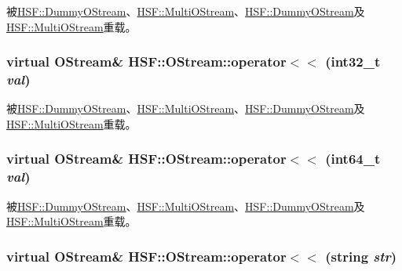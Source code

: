 被\hyperlink{classHSF_1_1DummyOStream_a7c3f9f5c2e3a05760819499df1aa6592}{HSF::DummyOStream}、\hyperlink{classHSF_1_1MultiOStream_a40a0605bc99045578fccf9c5413411f5}{HSF::MultiOStream}、\hyperlink{classHSF_1_1DummyOStream_a7c3f9f5c2e3a05760819499df1aa6592}{HSF::DummyOStream}及\hyperlink{classHSF_1_1MultiOStream_a40a0605bc99045578fccf9c5413411f5}{HSF::MultiOStream}重载。\hypertarget{classHSF_1_1OStream_a1bbf47f6f3c68938fb4c1006b878aa60}{
\subsubsection[{operator$<$$<$}]{\setlength{\rightskip}{0pt plus 5cm}virtual {\bf OStream}\& HSF::OStream::operator$<$$<$ (int32\_\-t {\em val})}}
\label{classHSF_1_1OStream_a1bbf47f6f3c68938fb4c1006b878aa60}


被\hyperlink{classHSF_1_1DummyOStream_a58e20bb47f254b73898d940bb496ee1f}{HSF::DummyOStream}、\hyperlink{classHSF_1_1MultiOStream_a83208fee91d9117cf7411cd63477c9fe}{HSF::MultiOStream}、\hyperlink{classHSF_1_1DummyOStream_a58e20bb47f254b73898d940bb496ee1f}{HSF::DummyOStream}及\hyperlink{classHSF_1_1MultiOStream_a83208fee91d9117cf7411cd63477c9fe}{HSF::MultiOStream}重载。\hypertarget{classHSF_1_1OStream_a771b87dab59786db30cf1d5eb5473e64}{
\subsubsection[{operator$<$$<$}]{\setlength{\rightskip}{0pt plus 5cm}virtual {\bf OStream}\& HSF::OStream::operator$<$$<$ (int64\_\-t {\em val})}}
\label{classHSF_1_1OStream_a771b87dab59786db30cf1d5eb5473e64}


被\hyperlink{classHSF_1_1DummyOStream_a439a7fa1b22a1e7bcc49fa43c686dc0d}{HSF::DummyOStream}、\hyperlink{classHSF_1_1MultiOStream_a960936ac105e7f2ed4801f0725dedfba}{HSF::MultiOStream}、\hyperlink{classHSF_1_1DummyOStream_a439a7fa1b22a1e7bcc49fa43c686dc0d}{HSF::DummyOStream}及\hyperlink{classHSF_1_1MultiOStream_a960936ac105e7f2ed4801f0725dedfba}{HSF::MultiOStream}重载。\hypertarget{classHSF_1_1OStream_a1e3204a3bf16caf916d3e18c562a709c}{
\subsubsection[{operator$<$$<$}]{\setlength{\rightskip}{0pt plus 5cm}virtual {\bf OStream}\& HSF::OStream::operator$<$$<$ (string {\em str})}}
\label{classHSF_1_1OStream_a1e3204a3bf16caf916d3e18c562a709c}


